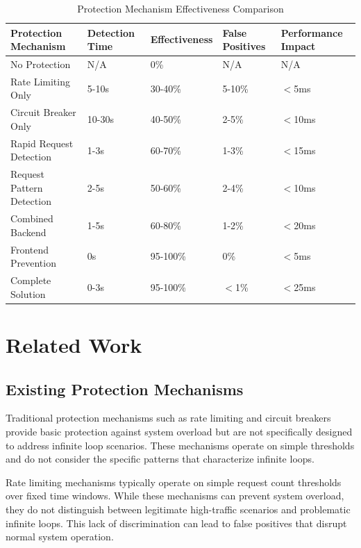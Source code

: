 \documentclass[10pt]{article}
\begin{document}
\begin{table}[ht]
\centering
\small
\begin{tabular}{|p{3cm}|p{2cm}|p{2cm}|p{2cm}|p{2.5cm}|}
\hline
\textbf{Protection Mechanism} & \textbf{Detection Time} & \textbf{Effectiveness} & \textbf{False Positives} & \textbf{Performance Impact} \\
\hline
No Protection & N/A & 0\% & N/A & N/A \\
\hline
Rate Limiting Only & 5-10s & 30-40\% & 5-10\% & $<$5ms \\
\hline
Circuit Breaker Only & 10-30s & 40-50\% & 2-5\% & $<$10ms \\
\hline
Rapid Request Detection & 1-3s & 60-70\% & 1-3\% & $<$15ms \\
\hline
Request Pattern Detection & 2-5s & 50-60\% & 2-4\% & $<$10ms \\
\hline
Combined Backend & 1-5s & 60-80\% & 1-2\% & $<$20ms \\
\hline
Frontend Prevention & 0s & 95-100\% & 0\% & $<$5ms \\
\hline
Complete Solution & 0-3s & 95-100\% & $<$1\% & $<$25ms \\
\hline
\end{tabular}
\caption{Protection Mechanism Effectiveness Comparison}
\label{tab:protection-effectiveness}
\end{table}

\section{Related Work}

\subsection{Existing Protection Mechanisms}

Traditional protection mechanisms such as rate limiting and circuit breakers provide basic protection against system overload but are not specifically designed to address infinite loop scenarios. These mechanisms operate on simple thresholds and do not consider the specific patterns that characterize infinite loops.

Rate limiting mechanisms typically operate on simple request count thresholds over fixed time windows. While these mechanisms can prevent system overload, they do not distinguish between legitimate high-traffic scenarios and problematic infinite loops. This lack of discrimination can lead to false positives that disrupt normal system operation.
\end{document}
